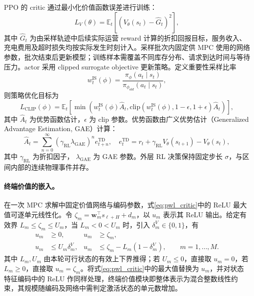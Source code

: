 \documentclass[12pt,a4paper,UTF8]{ctexart}
\begin{document}
PPO 的 critic 通过最小化价值函数误差进行训练：
\begin{equation}
L_V(\theta)=
\mathbb{E}_t\left[
\left(V_{\theta}(s_t)-\hat{G}_t\right)^2
\right],
\label{eq:value_loss}
\end{equation}
其中 $\hat{G}_t$ 为由采样轨迹中后续实际运营 reward 计算的折扣回报目标，服务收入、充电费用及超时损失均按实际发生时刻计入。采样批次内固定供 MPC 使用的网络参数，批次结束后更新模型；训练样本需覆盖不同库存分布、请求到达时间与等待压力。actor 采用 clipped surrogate objective 更新策略。定义重要性采样比率
\begin{equation}
w_t^{\mathrm{IS}}(\phi)=
\frac{\pi_{\phi}(a_t\mid s_t)}{\pi_{\phi_{old}}(a_t\mid s_t)},
\label{eq:ppo_ratio}
\end{equation}
则策略优化目标为
\begin{equation}
L_{\mathrm{CLIP}}(\phi)=
\mathbb{E}_t\left[
\min\left(
w_t^{\mathrm{IS}}(\phi)\hat{A}_t,
\mathrm{clip}(w_t^{\mathrm{IS}}(\phi),1-\epsilon,1+\epsilon)\hat{A}_t
\right)
\right],
\label{eq:ppo_clip}
\end{equation}
其中 $\hat{A}_t$ 为优势函数估计，$\epsilon$ 为 clip 参数。优势函数由广义优势估计（Generalized Advantage Estimation, GAE）计算：
\begin{equation}
\hat{A}_t=\sum_{n=0}^{\infty}
(\gamma_{\mathrm{RL}}\lambda_{\mathrm{GAE}})^n
e_{t+n}^{\mathrm{TD}},
\quad
e_t^{\mathrm{TD}}=r_t
+\gamma_{\mathrm{RL}}V_{\theta}(s_{t+1})-V_{\theta}(s_t),
\label{eq:gae}
\end{equation}
其中 $\gamma_{\mathrm{RL}}$ 为折扣因子，
$\lambda_{\mathrm{GAE}}$ 为 GAE 参数。外层 RL 决策保持固定步长 $\sigma$，与区间内部的连续物理事件并存。

\paragraph{终端价值的嵌入。}在一次 MPC 求解中固定价值网络与编码参数，式\eqref{eq:pwl_critic}中的 ReLU 最大值可逐单元线性化。令 $\zeta_m=\boldsymbol w_m^\top s_{\ell+H}+d_m$，以 $u_m$ 表示其 ReLU 输出。给定有效界 $L_m\le\zeta_m\le U_m$，当 $L_m<0<U_m$ 时，引入 $\delta_m^V\in\{0,1\}$，有
\begin{subequations}
\label{eq:pwl_critic_embedding}
\begin{align}
u_m&\ge0,& u_m&\ge\zeta_m,\\
u_m&\le U_m\delta_m^V,&
u_m&\le\zeta_m-L_m(1-\delta_m^V),
\qquad m=1,\ldots,M.
\end{align}
\end{subequations}
其中 $L_m,U_m$ 由本轮可行状态的有效上下界推得；若 $U_m\le0$，直接取 $u_m=0$，若 $L_m\ge0$，直接取 $u_m=\zeta_m$。将式\eqref{eq:pwl_critic}中的最大值替换为 $u_m$，并对状态特征编码中的 ReLU 作同样处理，终端价值模块即整体表示为混合整数线性约束，其规模随编码及网络中需判定激活状态的单元数增加。
\end{document}
